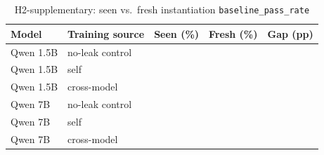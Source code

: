 \begin{table}[b]
\caption{H2-supplementary: seen vs.\ fresh instantiation \texttt{baseline\_pass\_rate}}
\label{tab:h2supp}
\centering
\footnotesize
\setlength{\tabcolsep}{3.5pt}
\renewcommand{\arraystretch}{0.88}
\begin{tabular}{@{}llrrr@{}}
\toprule
Model & Training source & Seen (\%) & Fresh (\%) & Gap (pp) \\
\midrule
Qwen 1.5B & no-leak control & \HSuppOneFiveBControlSeen{} & \HSuppOneFiveBControlFresh{} & \HSuppOneFiveBControlGap{} \\ %
Qwen 1.5B & self & \HSuppOneFiveBSelfSeen{} & \HSuppOneFiveBSelfFresh{} & \HSuppOneFiveBSelfGap{} \\ %
Qwen 1.5B & cross-model & \HSuppOneFiveBCrossSeen{} & \HSuppOneFiveBCrossFresh{} & \HSuppOneFiveBCrossGap{} \\ %
Qwen 7B & no-leak control & \HSuppSevenBControlSeen{} & \HSuppSevenBControlFresh{} & \HSuppSevenBControlGap{} \\
Qwen 7B & self & \HSuppSevenBSelfSeen{} & \HSuppSevenBSelfFresh{} & \HSuppSevenBSelfGap{} \\
Qwen 7B & cross-model & \HSuppSevenBCrossSeen{} & \HSuppSevenBCrossFresh{} & \HSuppSevenBCrossGap{} \\
\bottomrule
\end{tabular}
\end{table}

